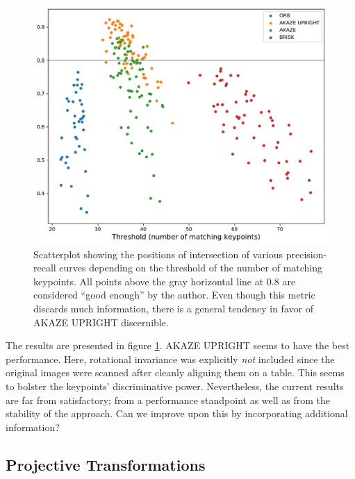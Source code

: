 \documentclass{ltjarticle}
\begin{document}
\begin{figure}
    \centering
    \includegraphics[width=\textwidth]{keypoint-evaluation.pdf}
    \caption[Scatterplot of keypoint performance]{Scatterplot showing the positions of intersection of various precision-recall curves depending on the threshold of the number of matching keypoints. All points above the gray horizontal line at $0.8$ are considered “good enough” by the author. Even though this metric discards much information, there is a general tendency in favor of AKAZE UPRIGHT discernible.}
    \label{fig:keypoint-evaluation}
\end{figure}

The results are presented in figure \ref{fig:keypoint-evaluation}. AKAZE UPRIGHT seems to have the best performance. Here, rotational invariance was explicitly \emph{not} included since the original images were scanned after cleanly aligning them on a table. This seems to bolster the keypoints' discriminative power. Nevertheless, the current results are far from satisfactory; from a performance standpoint as well as from the stability of the approach. Can we improve upon this by incorporating additional information?

\subsection{Projective Transformations}
\label{sec:projective-transformations}
\end{document}
